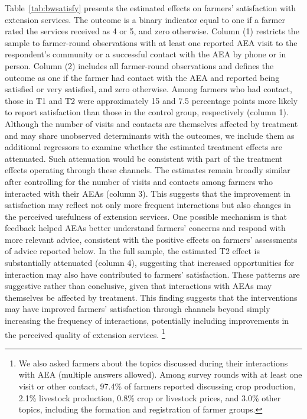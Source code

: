 \documentclass[11pt]{article}
\begin{document}
Table~\ref{tab:bwsatisfy} presents the estimated effects on farmers' satisfaction with extension services. The outcome is a binary indicator equal to one if a farmer rated the services received as 4 or 5, and zero otherwise. Column (1) restricts the sample to farmer-round observations with at least one reported AEA visit to the respondent's community or a successful contact with the AEA by phone or in person. Column (2) includes all farmer-round observations and defines the outcome as one if the farmer had contact with the AEA and reported being satisfied or very satisfied, and zero otherwise. Among farmers who had contact, those in T1 and T2 were approximately 15 and 7.5 percentage points more likely to report satisfaction than those in the control group, respectively (column 1). Although the number of visits and contacts are themselves affected by treatment and may share unobserved determinants with the outcomes, we include them as additional regressors to examine whether the estimated treatment effects are attenuated. Such attenuation would be consistent with part of the treatment effects operating through these channels. The estimates remain broadly similar after controlling for the number of visits and contacts among farmers who interacted with their AEAs (column 3). This suggests that the improvement in satisfaction may reflect not only more frequent interactions but also changes in the perceived usefulness of extension services. One possible mechanism is that feedback helped AEAs better understand farmers' concerns and respond with more relevant advice, consistent with the positive effects on farmers' assessments of advice reported below. In the full sample, the estimated T2 effect is substantially attenuated (column 4), suggesting that increased opportunities for interaction may also have contributed to farmers' satisfaction. These patterns are suggestive rather than conclusive, given that interactions with AEAs may themselves be affected by treatment. This finding suggests that the interventions may have improved farmers' satisfaction through channels beyond simply increasing the frequency of interactions, potentially including improvements in the perceived quality of extension services. \footnote{We also asked farmers about the topics discussed during their interactions with AEA (multiple answers allowed). Among survey rounds with at least one visit or other contact, 97.4\% of farmers reported discussing crop production, 2.1\% livestock production, 0.8\% crop or livestock prices, and 3.0\% other topics, including the formation and registration of farmer groups.}
\end{document}
